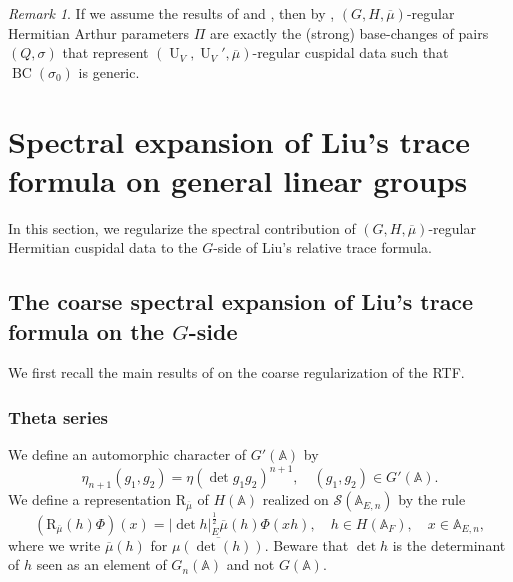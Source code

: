 \documentclass[letterpaper,11pt]{amsart}
\newcommand{\bA}{\mathbb{A}}
\newcommand{\cS}{\mathcal{S}}
\newcommand{\<}{\negthickspace}
\newcommand{\valP}[1]{\left|#1\right|}
\DeclareMathOperator{\GL}{GL}
\DeclareMathOperator{\U}{U}
\DeclareMathOperator{\BC}{BC}
\theoremstyle{definition}
\theoremstyle{plain}
\theoremstyle{remark}
\newtheorem{remark}[definition]{Remark}
\numberwithin{equation}{section}
\begin{document}
\begin{remark}
    If we assume the results of \cite{Mok} and \cite{KMSW}, then by \cite{Ram}, $(G,H,\overline{\mu})$-regular Hermitian Arthur parameters $\Pi$ are exactly the (strong) base-changes of pairs $(Q,\sigma)$ that represent $(\U_V,\U_V',\overline{\mu})$-regular cuspidal data such that $\BC(\sigma_0)$ is generic.
\end{remark}

\section{Spectral expansion of Liu's trace formula on general linear groups}
\label{sec:spectral_calculation_GL}


\label{sec:spec_GLN}

In this section, we regularize the spectral contribution of $(G,H,\overline{\mu})$-regular Hermitian cuspidal data to the $G$-side of Liu's relative trace formula.

\subsection[The coarse spectral expansion on $\GL_n \times \GL_{n+1}$]{The coarse spectral expansion of Liu's trace formula on the \texorpdfstring{$G$}{G}-side}
\label{sec:coarse_spectral_Liu}

We first recall the main results of \cite{BLX1} on the coarse regularization of the RTF.

\subsubsection{Theta series}
\label{subsec:theta_series}

We define an automorphic character of $G'(\bA)$ by
\begin{equation}
    \label{eq:eta_defi}
          \eta_{n+1}(g_1, g_2) = \eta(\det g_1 g_2)^{n+1}, \quad (g_1,g_2) \in G'(\bA).
    \end{equation}
We define a representation $\mathrm{R}_{\overline{\mu}}$ of $H(\bA)$ realized on $\cS(\bA_{E,n})$ by the rule
\begin{equation*}
(\mathrm{R}_{\overline{\mu}}(h) \Phi)(x)=
\valP{ \det h}_E^{\frac{1}{2}} \overline{\mu}(h)
\Phi(xh), \quad h \in H(\bA_F), \quad x \in \bA_{E,n},
\end{equation*}
where we write $\overline{\mu}(h)$ for $\overline{\mu(\det(h))}$. Beware that $\det h$ is the determinant of $h$ seen as an element of $G_n(\bA)$ and not $G(\bA)$.
\end{document}
